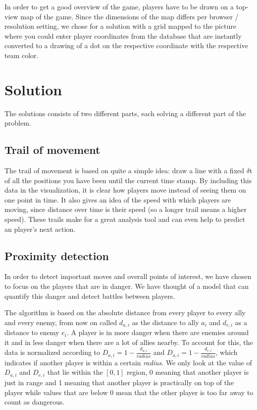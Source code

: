 \documentclass[a4paper]{article}
\theoremstyle{plain} %
\theoremstyle{definition} %
\begin{document}
In order to get a good overview of the game, players have to be drawn on a top-view map of the game.
Since the dimensions of the map differs per browser / resolution setting, we chose for a solution with a grid mapped to the picture where you could enter player coordinates from the database that are instantly converted to a drawing of a dot on the respective coordinate with the respective team color. 

\section*{Solution}
The solutions consists of two different parts, each solving a different part of the problem.

\subsection*{Trail of movement}
The trail of movement is based on quite a simple idea:  draw a line with a fixed $\delta$t of all the positions you have been until the current time stamp. By including this data in the visualization, it is clear how players move instead of seeing them on one point in time. It also gives an idea of the speed with which players are moving, since distance over time is their speed (so a longer trail means a higher speed). These trails make for a great analysis tool and can even help to predict an player's next action.

\subsection*{Proximity detection}
In order to detect important moves and overall points of interest, we have chosen to focus on the players that are in danger. We have thought of a model that can quantify this danger and detect battles between players.

The algorithm is based on the absolute distance from every player to every ally and every enemy, from now on called $d_{a,i}$ as the distance to ally $a_i$ and $d_{e,i}$ as a distance to enemy $e_i$. A player is in more danger when there are enemies around it and in less danger when there are a lot of allies nearby. To account for this, the data is normalized according to $D_{a,i} = 1- \frac{d_{a,i}}{radius}$ and $D_{a,i} = 1- \frac{d_{e,i}}{radius}$, which indicates if another player is within a certain \emph{radius}. We only look at the value of $D_{a,i}$ and $D_{e,i}$ that lie within the $[0,1]$ region, 0 meaning that another player is just in range and 1 meaning that another player is practically on top of the player while values that are below 0 mean that the other player is too far away to count as dangerous.
\end{document}
